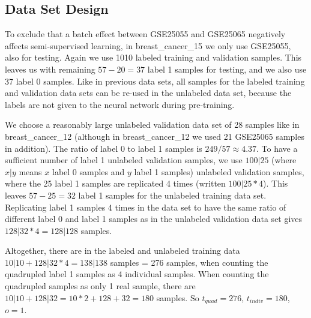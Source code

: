 \subsection{Data Set Design\label{subsec:Data-Set-Design-of-breast_cancer_15}}

To exclude that a batch effect between GSE25055 and GSE25065 negatively
affects semi-supervised learning, in breast\_cancer\_15 we only use
GSE25055, also for testing. Again we use 10\textbar{}10 labeled training
and validation samples. This leaves us with remaining $57-20=37$
label 1 samples for testing, and we also use 37 label 0 samples. Like
in previous data sets, all samples for the labeled training and validation
data sets can be re-used in the unlabeled data set, because the labels
are not given to the neural network during pre-training.

We choose a reasonably large unlabeled validation data set of 28 samples
like in breast\_cancer\_12 (although in breast\_cancer\_12 we used
21 GSE25065 samples in addition). The ratio of label 0 to label 1
samples is $249/57\approx4.37$. To have a sufficient number of label
1 unlabeled validation samples, we use $100|25$ (where $x|y$ means
$x$ label 0 samples and $y$ label 1 samples) unlabeled validation
samples, where the 25 label 1 samples are replicated 4 times (written
$100|25*4$). This leaves $57-25=32$ label 1 samples for the unlabeled
training data set. Replicating label 1 samples 4 times in the data
set to have the same ratio of different label 0 and label 1 samples
as in the unlabeled validation data set gives $128|32*4=128|128$
samples.

Altogether, there are in the labeled and unlabeled training data $10|10+128|32*4=138|138$
samples = 276 samples, when counting the quadrupled label 1 samples
as 4 individual samples. When counting the quadrupled samples as only
1 real sample, there are $10|10+128|32=10*2+128+32=180$ samples.
So $t_{quad}=276$, $t_{indiv}=180$, $o=1$.

